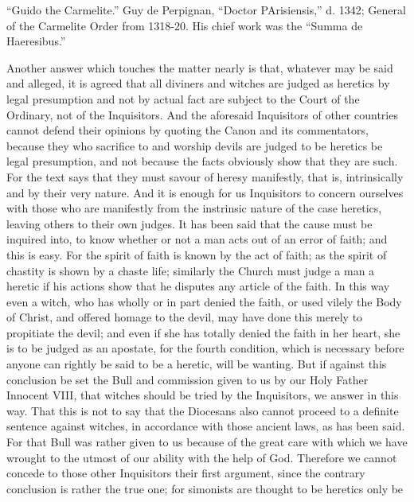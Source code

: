            “Guido the Carmelite.” Guy de Perpignan, “Doctor PArisiensis,” d. 1342; General of
        the Carmelite Order from 1318-20. His chief work was the “Summa de Haeresibus.”

             Another answer which touches the matter nearly is that, whatever may be said and
       alleged, it is agreed that all diviners and witches are judged as heretics by legal presumption
       and not by actual fact are subject to the Court of the Ordinary, not of the Inquisitors. And
       the aforesaid Inquisitors of other countries cannot defend their opinions by quoting the
       Canon and its commentators, because they who sacrifice to and worship devils are judged to
       be heretics be legal presumption, and not because the facts obviously show that they are
       such. For the text says that they must savour of heresy manifestly, that is, intrinsically and
       by their very nature. And it is enough for us Inquisitors to concern ourselves with those who
       are manifestly from the instrinsic nature of the case heretics, leaving others to their own
       judges.
             It has been said that the cause must be inquired into, to know whether or not a man acts
       out of an error of faith; and this is easy. For the spirit of faith is known by the act of faith; as
       the spirit of chastity is shown by a chaste life; similarly the Church must judge a man a
       heretic if his actions show that he disputes any article of the faith. In this way even a witch,
       who has wholly or in part denied the faith, or used vilely the Body of Christ, and offered
       homage to the devil, may have done this merely to propitiate the devil; and even if she has
       totally denied the faith in her heart, she is to be judged as an apostate, for the fourth
       condition, which is necessary before anyone can rightly be said to be a heretic, will be
       wanting.
             But if against this conclusion be set the Bull and commission given to us by our Holy
       Father Innocent VIII, that witches should be tried by the Inquisitors, we answer in this way.
       That this is not to say that the Diocesans also cannot proceed to a definite sentence against
       witches, in accordance with those ancient laws, as has been said. For that Bull was rather
       given to us because of the great care with which we have wrought to the utmost of our
       ability with the help of God.
             Therefore we cannot concede to those other Inquisitors their first argument, since the
       contrary conclusion is rather the true one; for simonists are thought to be heretics only be
